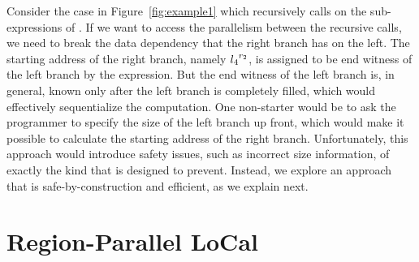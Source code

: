 \documentclass[acmsmall,acmthm=false,nonacm]{acmart}
\theoremstyle{straighttext0}
\theoremstyle{straighttext}
\newcommand{\Figref}[1]{Figure~\ref{#1}}
\begin{document}
Consider the case in \Figref{fig:example1} which recursively calls
 on the sub-expressions of .
%
If we want to access the parallelism between the recursive calls,
we need to break the data dependency that the right branch has on
the left.
%
The starting address of the right branch, namely ${l_4}^{r_2}$, is
assigned to be end witness of the left branch by the 
expression.
%
But the end witness of the left branch is, in general, known only
after the left branch is completely filled, which would effectively
sequentialize the computation.
%
One non-starter would be to ask the programmer to specify the
size of the left branch up front, which would make it possible to
calculate the starting address of the right branch.
%
Unfortunately, this approach would introduce safety issues, such as
incorrect size information, of exactly the kind that \seqcalc{}
is designed to prevent.
%
Instead, we explore an approach that is safe-by-construction and
efficient, as we explain next.


\section{Region-Parallel LoCal}
\label{sec:region-parallel-local}
\end{document}
